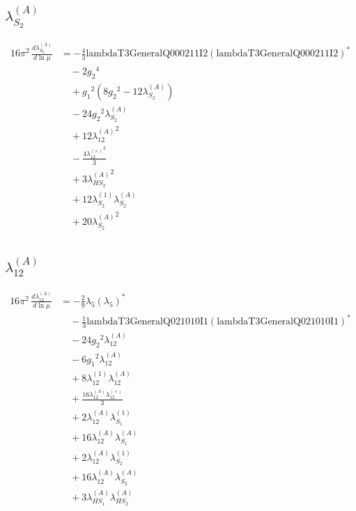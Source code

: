 \documentclass[10pt,a4paper]{article}
\begin{document}
\subsection*{$\lambda_{S_2}^{(A)}$}
\begin{align*}
16\pi^2\,\frac{d \lambda_{S_2}^{(A)}}{d\ln\mu} &=-\frac{4}{3} \text{lambdaT3GeneralQ000211I2} \left(\text{lambdaT3GeneralQ000211I2}\right)^{*} \\
&\quad -2 {g_2}^4 \\
&\quad +{g_1}^2 \left(8 {g_2}^2-12 {\lambda_{S_2}^{(A)}}\right) \\
&\quad -24 {g_2}^2 {\lambda_{S_2}^{(A)}} \\
&\quad +12 {\lambda_{12}^{(A)}}^2 \\
&\quad -\frac{4 {\lambda_{12}^{(\times)}}^2}{3} \\
&\quad +3 {\lambda_{HS_2}^{(A)}}^2 \\
&\quad +12 {\lambda_{S_2}^{(1)}} {\lambda_{S_2}^{(A)}} \\
&\quad +20 {\lambda_{S_2}^{(A)}}^2 \\
\end{align*}
\subsection*{$\lambda_{12}^{(A)}$}
\begin{align*}
16\pi^2\,\frac{d \lambda_{12}^{(A)}}{d\ln\mu} &=-\frac{2}{9} {\lambda_5} \left({\lambda_5}\right)^{*} \\
&\quad -\frac{1}{3} \text{lambdaT3GeneralQ021010I1} \left(\text{lambdaT3GeneralQ021010I1}\right)^{*} \\
&\quad -24 {g_2}^2 {\lambda_{12}^{(A)}} \\
&\quad -6 {g_1}^2 {\lambda_{12}^{(A)}} \\
&\quad +8 {\lambda_{12}^{(1)}} {\lambda_{12}^{(A)}} \\
&\quad +\frac{16 {\lambda_{12}^{(A)}} {\lambda_{12}^{(\times)}}}{3} \\
&\quad +2 {\lambda_{12}^{(A)}} {\lambda_{S_1}^{(1)}} \\
&\quad +16 {\lambda_{12}^{(A)}} {\lambda_{S_1}^{(A)}} \\
&\quad +2 {\lambda_{12}^{(A)}} {\lambda_{S_2}^{(1)}} \\
&\quad +16 {\lambda_{12}^{(A)}} {\lambda_{S_2}^{(A)}} \\
&\quad +3 {\lambda_{HS_1}^{(A)}} {\lambda_{HS_2}^{(A)}} \\
\end{align*}
\end{document}
